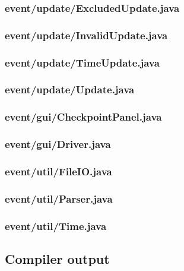 \documentclass[a4paper, twoside]{article}
\begin{document}
\subsubsection{event/update/ExcludedUpdate.java}

\newpage
\subsubsection{event/update/InvalidUpdate.java}

\newpage
\subsubsection{event/update/TimeUpdate.java}

\newpage
\subsubsection{event/update/Update.java}

\newpage
\subsubsection{event/gui/CheckpointPanel.java}

\newpage
\subsubsection{event/gui/Driver.java}

\newpage
\subsubsection{event/util/FileIO.java}

\subsubsection{event/util/Parser.java}

\newpage
\subsubsection{event/util/Time.java}

\newpage
\subsection{Compiler output}
\lstset{tabsize=2, breaklines=true, breakatwhitespace=false, basicstyle=\ttfamily}

\lstset{tabsize=2, breaklines=true, breakatwhitespace=true, basicstyle=\ttfamily}
\end{document}
